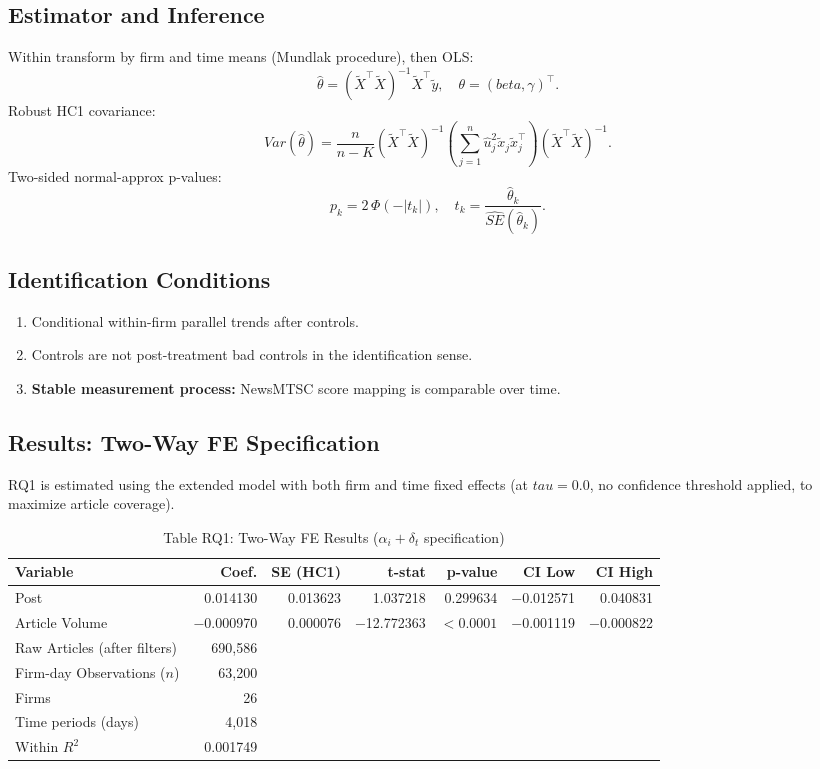 \documentclass[11pt]{article}
\def\beta{beta}%
\def\tau{tau}%
\def\mathrm#1{#1}%
\newcommand{\Var}{\mathrm{Var}}
\begin{document}
\subsection*{Estimator and Inference}
Within transform by firm and time means (Mundlak procedure), then OLS:
\[
\hat{\theta}=(\tilde{X}^{\top}\tilde{X})^{-1}\tilde{X}^{\top}\tilde{y},\quad
\theta=(\beta,\gamma)^{\top}.
\]
Robust HC1 covariance:
\[
\widehat{\Var}(\hat{\theta}) = \frac{n}{n-K}(\tilde{X}^{\top}\tilde{X})^{-1}
\left(\sum_{j=1}^{n}\hat{u}_j^2\tilde{x}_j\tilde{x}_j^{\top}\right)
(\tilde{X}^{\top}\tilde{X})^{-1}.
\]
Two-sided normal-approx p-values:
\[
p_k = 2\,\Phi(-|t_k|),\quad t_k=\frac{\hat{\theta}_k}{\widehat{\mathrm{SE}}(\hat{\theta}_k)}.
\]

\subsection*{Identification Conditions}
\begin{enumerate}[leftmargin=1.5em]
\item Conditional within-firm parallel trends after controls.
\item Controls are not post-treatment bad controls in the identification sense.
\item \textbf{Stable measurement process:} NewsMTSC score mapping is comparable over time.
\end{enumerate}

\subsection*{Results: Two-Way FE Specification}
RQ1 is estimated using the extended model with both firm and time fixed effects (at $\tau=0.0$, no confidence threshold applied, to maximize article coverage).

\begin{table}[H]
\centering
\caption*{Table RQ1: Two-Way FE Results ($\alpha_i + \delta_t$ specification)}
\begin{tabular}{lrrrrrr}
\toprule
Variable & Coef. & SE (HC1) & t-stat & p-value & CI Low & CI High \\
\midrule
Post & 0.014130 & 0.013623 & 1.037218 & 0.299634 & $-$0.012571 & 0.040831 \\
Article Volume & $-$0.000970 & 0.000076 & $-$12.772363 & $<0.0001$ & $-$0.001119 & $-$0.000822 \\
\midrule
Raw Articles (after filters) & 690,586 & \multicolumn{5}{r}{} \\
Firm-day Observations ($n$) & 63,200 & \multicolumn{5}{r}{} \\
Firms & 26 & \multicolumn{5}{r}{} \\
Time periods (days) & 4,018 & \multicolumn{5}{r}{} \\
Within $R^2$ & 0.001749 & \multicolumn{5}{r}{} \\
\bottomrule
\end{tabular}
\end{table}
\end{document}
